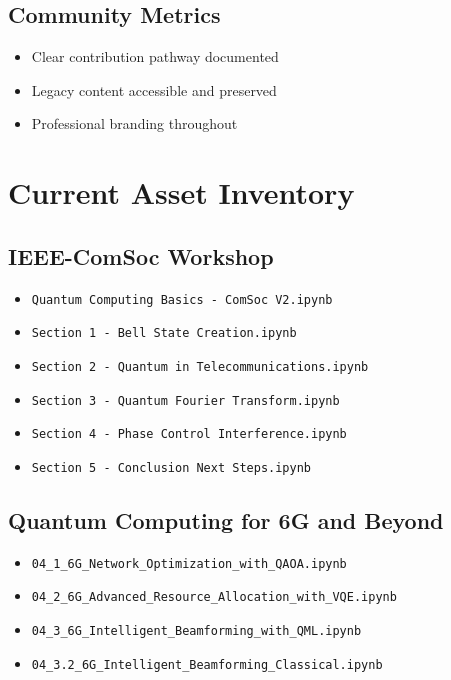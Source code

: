 \documentclass[11pt,a4paper]{article}
\begin{document}
\subsection{Community Metrics}
\begin{itemize}
    \item Clear contribution pathway documented
    \item Legacy content accessible and preserved
    \item Professional branding throughout
\end{itemize}

\appendix
\section{Current Asset Inventory}

\subsection{IEEE-ComSoc Workshop}
\begin{itemize}
    \item \texttt{Quantum Computing Basics - ComSoc V2.ipynb}
    \item \texttt{Section 1 - Bell State Creation.ipynb}
    \item \texttt{Section 2 - Quantum in Telecommunications.ipynb}
    \item \texttt{Section 3 - Quantum Fourier Transform.ipynb}
    \item \texttt{Section 4 - Phase Control Interference.ipynb}
    \item \texttt{Section 5 - Conclusion Next Steps.ipynb}
\end{itemize}

\subsection{Quantum Computing for 6G and Beyond}
\begin{itemize}
    \item \texttt{04\_1\_6G\_Network\_Optimization\_with\_QAOA.ipynb}
    \item \texttt{04\_2\_6G\_Advanced\_Resource\_Allocation\_with\_VQE.ipynb}
    \item \texttt{04\_3\_6G\_Intelligent\_Beamforming\_with\_QML.ipynb}
    \item \texttt{04\_3.2\_6G\_Intelligent\_Beamforming\_Classical.ipynb}
\end{itemize}
\end{document}
